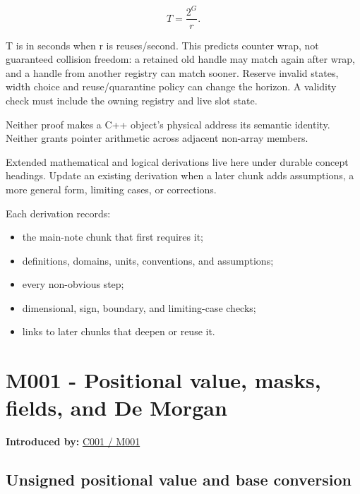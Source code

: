 \[
T=\frac{2^G}{r}.
\]

T is in seconds when r is reuses/second. This predicts counter wrap, not guaranteed collision freedom: a retained old handle may match again after wrap, and a handle from another registry can match sooner. Reserve invalid states, width choice and reuse/quarantine policy can change the horizon. A validity check must include the owning registry and live slot state.

Neither proof makes a C++ object's physical address its semantic identity. Neither grants pointer arithmetic across adjacent non-array members.

Extended mathematical and logical derivations live here under durable concept headings. Update an existing derivation when a later chunk adds assumptions, a more general form, limiting cases, or corrections.

Each derivation records:

\begin{itemize}
\tightlist
\item
  the main-note chunk that first requires it;
\item
  definitions, domains, units, conventions, and assumptions;
\item
  every non-obvious step;
\item
  dimensional, sign, boundary, and limiting-case checks;
\item
  links to later chunks that deepen or reuse it.
\end{itemize}

\section{M001 - Positional value, masks, fields, and De Morgan}\label{01-foundations-i-ch011-m001---positional-value-masks-fields-and-de-morgan}

\hypertarget{01-foundations-i-ch011-m001---positional-value-masks-fields-and-de-morgan}{}

\textbf{Introduced by:} \hyperref[01-foundations-i-ch001-from-a-signal-to-an-interpretation]{C001 / M001}

\subsection{Unsigned positional value and base conversion}\label{01-foundations-i-ch011-unsigned-positional-value-and-base-conversion}

\hypertarget{01-foundations-i-ch011-unsigned-positional-value-and-base-conversion}{}

